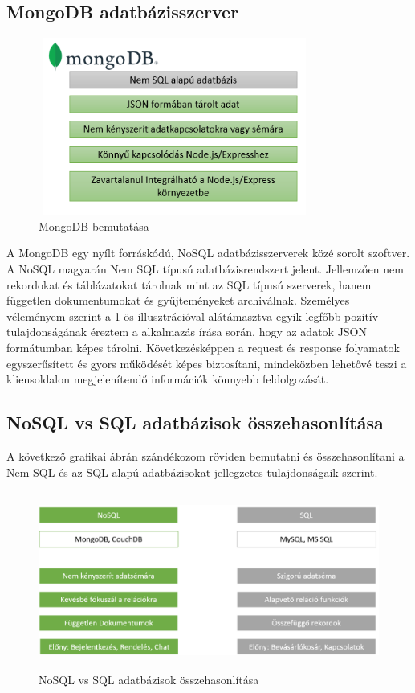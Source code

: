 \subsection{MongoDB adatbázisszerver}

\begin{figure}[H]
	\centering
	\includegraphics[width=0.8\textwidth,height=220px]{images/mongodb_bemutatasa.png}
	\caption{MongoDB bemutatása}
	\label{fig.picture-5}
\end{figure}

A MongoDB egy nyílt forráskódú, NoSQL adatbázisszerverek közé sorolt szoftver. A NoSQL magyarán Nem SQL típusú adatbázisrendszert jelent. Jellemzően nem rekordokat és táblázatokat tárolnak mint az SQL típusú szerverek, hanem független dokumentumokat és gyűjteményeket archiválnak. Személyes véleményem szerint a \ref{fig.picture-5}-ös illusztrációval alátámasztva egyik legfőbb pozitív tulajdonságának éreztem a alkalmazás írása során, hogy az adatok JSON formátumban képes tárolni. Következésképpen a request és response folyamatok egyszerűsített és gyors működését képes biztosítani, mindeközben lehetővé teszi a kliensoldalon megjelenítendő információk könnyebb feldolgozását. 
\bigskip

\subsection{NoSQL vs SQL adatbázisok összehasonlítása}

A következő grafikai ábrán szándékozom röviden bemutatni és összehasonlítani a Nem SQL és az SQL alapú adatbázisokat jellegzetes tulajdonságaik szerint.

\begin{figure}[H]
	\centering
	\includegraphics[width=1.0\textwidth,height=220px]{images/nosql_bemutatasa.png}
	\caption{NoSQL vs SQL adatbázisok összehasonlítása}
	\label{fig.picture-6}
\end{figure}

